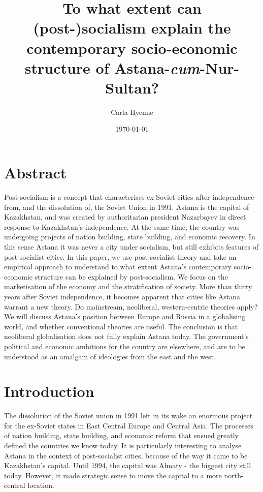\documentclass{article}
\title{To what extent can (post-)socialism explain the contemporary socio-economic structure of Astana-\textit{cum}-Nur-Sultan?}
\author{Carla Hyenne}
\date{\today}
\begin{document}
\maketitle 

\section{Abstract}

Post-socialism is a concept that characterises ex-Soviet cities after independence from, and the dissolution of, the Soviet Union in 1991.
Astana is the capital of Kazakhstan, and was created by authoritarian president Nazarbayev in direct response to Kazakhstan's independence. At the same time, the country was undergoing projects of nation building, state building, and economic recovery. In this sense Astana it was never a city under socialism, but still exhibits features of post-socialist cities. In this paper, we use post-socialist theory and take an empirical approach to understand to what extent Astana's contemporary socio-economic structure can be explained by post-socialism. 
We focus on the marketisation of the economy and the stratification of society. 
More than thirty years after Soviet independence, it becomes apparent that cities like Astana warrant a new theory. Do mainstream, neoliberal, western-centric theories apply? We will discuss Astana's position between Europe and Russia in a globalising world, and whether conventional theories are useful. The conclusion is that neoliberal globalisation does not fully explain Astana today. The government's political and economic ambitions for the country are elsewhere, and are to be understood as an amalgam of ideologies from the east and the west.

\section{Introduction}

The dissolution of the Soviet union in 1991 left in its wake an enormous project for the ex-Soviet states in East Central Europe and Central Asia. The processes of nation building, state building, and economic reform that ensued greatly defined the countries we know today. It is particularly interesting to analyse Astana in the context of post-socialist cities, because of the way it came to be Kazakhstan's capital. 
Until 1994, the capital was Almaty - the biggest city still today. However, it made strategic sense to move the capital to a more north-central location. 
\end{document}
